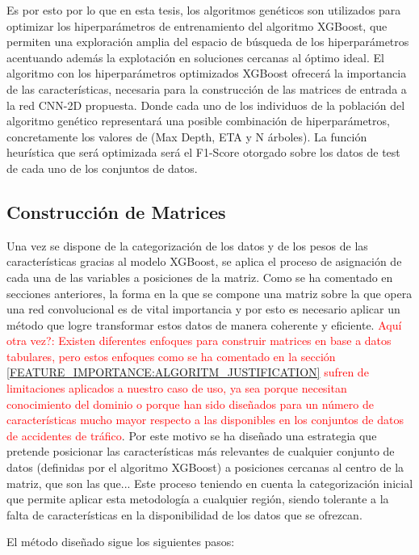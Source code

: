 \documentclass{uathesis-es}
\begin{document}
Es por esto por lo que en esta tesis, los algoritmos genéticos son utilizados para optimizar los hiperparámetros de entrenamiento del algoritmo XGBoost, que permiten una exploración amplia del espacio de búsqueda de los hiperparámetros acentuando además la explotación en soluciones cercanas al óptimo ideal. El algoritmo con los hiperparámetros optimizados XGBoost ofrecerá la importancia de las características, necesaria para la construcción de las matrices de entrada a la red CNN-2D propuesta. Donde cada uno de los individuos de la población del algoritmo genético representará una posible combinación de hiperparámetros, concretamente los valores de (Max Depth, ETA y N árboles). La función heurística que será optimizada será el F1-Score otorgado sobre los datos de test de cada uno de los conjuntos de datos.


\subsection{Construcción de Matrices}

Una vez se dispone de la categorización de los datos y de los pesos de las características gracias al modelo XGBoost, se aplica el proceso de asignación de cada una de las variables a posiciones de la matriz. Como se ha comentado en secciones anteriores, la forma en la que se compone una matriz sobre la que opera una red convolucional es de vital importancia y por esto es necesario aplicar un método que logre transformar estos datos de manera coherente y eficiente. \textcolor{red}{Aquí otra vez?: Existen diferentes enfoques para construir matrices en base a datos tabulares, pero estos enfoques como se ha comentado en la sección \ref{FEATURE_IMPORTANCE:ALGORITM_JUSTIFICATION} sufren de limitaciones aplicados a nuestro caso de uso, ya sea porque necesitan conocimiento del dominio o porque han sido diseñados para un número de características mucho mayor respecto a las disponibles en los conjuntos de datos de accidentes de tráfico}. Por este motivo se ha diseñado una estrategia que pretende posicionar las características más relevantes de cualquier conjunto de datos (definidas por el algoritmo XGBoost) a posiciones cercanas al centro de la matriz, que son las que... Este proceso teniendo en cuenta la categorización inicial que permite aplicar esta metodología a cualquier región, siendo tolerante a la falta de características en la disponibilidad de los datos que se ofrezcan.

El método diseñado sigue los siguientes pasos:
\end{document}
